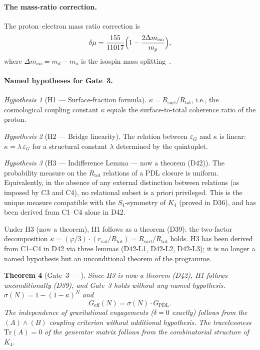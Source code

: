 \documentclass[11pt,a4paper]{article}
\theoremstyle{plain}
\newtheorem{theorem}{Theorem}[section]
\theoremstyle{definition}
\theoremstyle{remark}
\newtheorem{hypothesis}[theorem]{Hypothesis}
\newcommand{\Kfour}{K_4}
\newcommand{\Geff}{G_{\mathrm{eff}}}
\newcommand{\GPDL}{G_{\mathrm{PDL}}}
\newcommand{\epsG}{\varepsilon_G}
\newcommand{\rval}{r_{\mathrm{val}}}
\newcommand{\Rsurf}{R_{\mathrm{surf}}}
\newcommand{\Rtot}{R_{\mathrm{tot}}}
\begin{document}
\paragraph{The mass-ratio correction.}
The proton--electron mass ratio correction is
\[
\delta\mu = \frac{155}{11017}\Bigl(1 - \frac{2\Delta m_{\mathrm{iso}}}{m_p}\Bigr),
\]
where $\Delta m_{\mathrm{iso}} = m_d - m_u$ is the isospin mass splitting~\citep{D28}.

\paragraph{Named hypotheses for Gate~3.}

\begin{hypothesis}[H1 — Surface-fraction formula]
$\kappa = \Rsurf/\Rtot$, i.e., the cosmological coupling constant $\kappa$ equals the surface-to-total coherence ratio of the proton.
\end{hypothesis}

\begin{hypothesis}[H2 — Bridge linearity]
The relation between $\epsG$ and $\kappa$ is linear: $\kappa = \lambda\,\epsG$ for a structural constant $\lambda$ determined by the quintuplet.
\end{hypothesis}

\begin{hypothesis}[H3 — Indifference Lemma — \textcolor{proofblue}{now a theorem (D42)}]
The probability measure on the $\Rtot$ relations of a PDL closure is uniform.
Equivalently, in the absence of any external distinction between relations (as imposed by C3 and C4), no relational subset is a priori privileged.
This is the unique measure compatible with the $S_4$-symmetry of $\Kfour$ (proved in D36), and has been derived from C1--C4 alone in D42.
\end{hypothesis}

Under H3 (now a theorem), H1 follows as a theorem (D39): the two-factor decomposition $\kappa = (\varphi/3)\cdot(\rval/\Rtot) = \Rsurf/\Rtot$ holds. H3 has been derived from C1--C4 in D42 via three lemmas (D42-L1, D42-L2, D42-L3); it is no longer a named hypothesis but an unconditional theorem of the programme.

\begin{theorem}[Gate~3 — \citep{D36}]
\label{thm:Gate3}
Since H3 is now a theorem (D42), H1 follows unconditionally (D39), and Gate~3 holds without any named hypothesis.
$\sigma(N) = 1-(1-\kappa)^N$ and
\[
\Geff(N) = \sigma(N)\cdot\GPDL.
\]
The independence of gravitational engagements ($\delta=0$ exactly) follows from the $(A)\wedge(B)$ coupling criterion without additional hypothesis.
The tracelessness $\mathrm{Tr}(A)=0$ of the generator matrix follows from the combinatorial structure of $\Kfour$.
\end{theorem}
\end{document}
